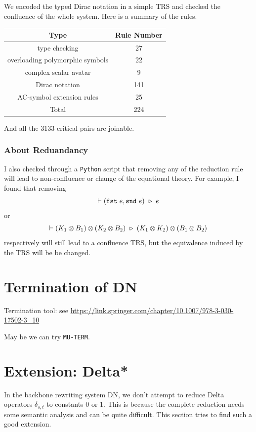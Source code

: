 We encoded the typed Dirac notation in a simple TRS and checked the confluence of the whole system. Here is a summary of the rules.


\begin{center}
  \begin{tabular}{c|c}
  \hline
  Type & Rule Number \\
  \hline
  type checking & 27 \\
  overloading polymorphic symbols & 22 \\
  complex scalar avatar & 9 \\
  Dirac notation & 141 \\
  AC-symbol extension rules & 25 \\
  \hline
  Total & 224 \\
  \hline
  \end{tabular}
\end{center}

And all the 3133 critical pairs are joinable.

\subsubsection*{About Reduandancy}
I also checked through a \texttt{Python} script that removing any of the reduction rule will lead to non-confluence or change of the equational theory. For example, I found that removing 
$$
\vdash (\texttt{fst}\ e, \texttt{snd}\ e)\ \triangleright\  e
$$
or
$$
\vdash (K_1 \otimes B_1) \otimes (K_2 \otimes B_2) \ \triangleright\  (K_1 \otimes K_2) \otimes (B_1 \otimes B_2)
$$
respectively will still lead to a confluence TRS, but the equivalence induced by the TRS will be be changed.


\section{Termination of DN}

Termination tool: see \url{https://link.springer.com/chapter/10.1007/978-3-030-17502-3_10}

May be we can try \texttt{MU-TERM}.

\section{Extension: Delta*}

In the backbone rewriting system DN, we don't attempt to reduce Delta operators $\delta_{s, t}$ to constants $0$ or $1$. This is because the complete reduction needs some semantic analysis and can be quite difficult. This section tries to find such a good extension.


